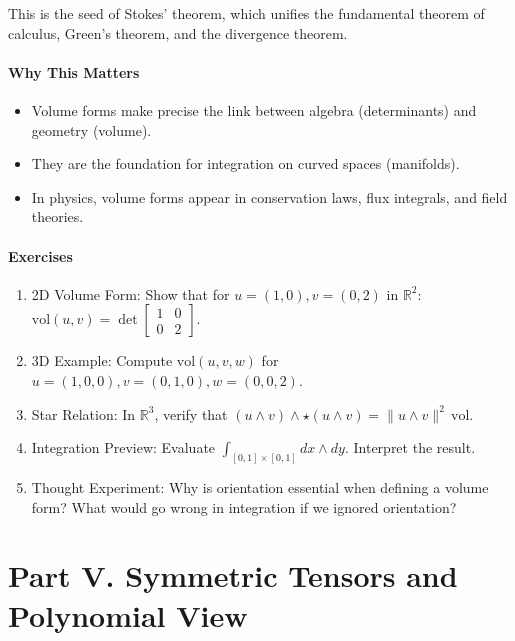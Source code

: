 \documentclass[
  letterpaper,
  DIV=11,
  numbers=noendperiod]{scrreprt}
\providecommand{\tightlist}{%
  \setlength{\itemsep}{0pt}\setlength{\parskip}{0pt}}
\begin{document}
This is the seed of Stokes' theorem, which unifies the fundamental
theorem of calculus, Green's theorem, and the divergence theorem.

\subsubsection{Why This Matters}\label{why-this-matters-22}

\begin{itemize}
\tightlist
\item
  Volume forms make precise the link between algebra (determinants) and
  geometry (volume).
\item
  They are the foundation for integration on curved spaces (manifolds).
\item
  In physics, volume forms appear in conservation laws, flux integrals,
  and field theories.
\end{itemize}

\subsubsection{Exercises}\label{exercises-34}

\begin{enumerate}
\def\labelenumi{\arabic{enumi}.}
\item
  2D Volume Form: Show that for \(u=(1,0), v=(0,2)\) in
  \(\mathbb{R}^2\):
  \(\mathrm{vol}(u,v) = \det \begin{bmatrix}1 & 0 \\ 0 & 2\end{bmatrix}\).
\item
  3D Example: Compute \(\mathrm{vol}(u,v,w)\) for
  \(u=(1,0,0), v=(0,1,0), w=(0,0,2)\).
\item
  Star Relation: In \(\mathbb{R}^3\), verify that
  \((u \wedge v) \wedge \star (u \wedge v) = \|u \wedge v\|^2 \, \mathrm{vol}\).
\item
  Integration Preview: Evaluate
  \(\int_{[0,1]\times [0,1]} dx \wedge dy\). Interpret the result.
\item
  Thought Experiment: Why is orientation essential when defining a
  volume form? What would go wrong in integration if we ignored
  orientation?
\end{enumerate}


\chapter{Part V. Symmetric Tensors and Polynomial
View}\label{part-v.-symmetric-tensors-and-polynomial-view}
\end{document}
